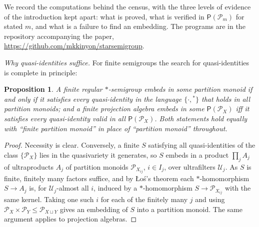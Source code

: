 \documentclass[11pt]{amsart}
\newtheorem{proposition}[theorem]{Proposition}
\theoremstyle{definition}
\renewcommand{\P}{\mathcal{P}}      %
\newcommand{\PA}{\mathsf{P}}         %
\begin{document}
We record the computations behind the census, with the three levels of evidence of the introduction kept apart: what is proved, what is verified in $\PA(\P_m)$ for stated $m$, and what is a failure to find an embedding. The programs are in the repository accompanying the paper, \url{https://github.com/mkkinyon/starsemigroup}.

\emph{Why quasi-identities suffice.} For finite semigroups the search for quasi-identities is complete in principle:

\begin{proposition}\label{prop:finite}
A finite regular $*$-semigroup embeds in some partition monoid if and only if it satisfies every quasi-identity in the language $\{\cdot,{}^*\}$ that holds in all partition monoids; and a finite projection algebra embeds in some $\PA(\P_X)$ iff it satisfies every quasi-identity valid in all $\PA(\P_X)$. Both statements hold equally with ``finite partition monoid'' in place of ``partition monoid'' throughout.
\end{proposition}

\begin{proof}
Necessity is clear. Conversely, a finite $S$ satisfying all quasi-identities of the class $\{\P_X\}$ lies in the quasivariety it generates, so $S$ embeds in a product $\prod_j A_j$ of ultraproducts $A_j$ of partition monoids $\P_{X_{ij}}$, $i\in I_j$, over ultrafilters $\mathcal U_j$. As $S$ is finite, finitely many factors suffice, and by \L o\'s's theorem each $*$-homomorphism $S\to A_j$ is, for $\mathcal U_j$-almost all $i$, induced by a $*$-homomorphism $S\to\P_{X_{ij}}$ with the same kernel. Taking one such $i$ for each of the finitely many $j$ and using $\P_X\times\P_Y\le\P_{X\sqcup Y}$ gives an embedding of $S$ into a partition monoid. The same argument applies to projection algebras.
\end{proof}
\end{document}
